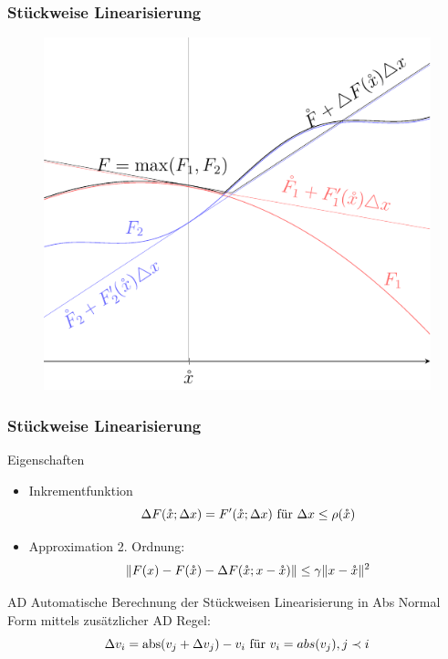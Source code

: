 \begin{frame}[<+->]
\frametitle{Stückweise Linearisierung}
\begin{figure}
\centering
\includegraphics[width=0.65\linewidth]{../dipl_tex/img/tikz/piecewise_linearization.pdf}
\end{figure}
\end{frame}

\begin{frame}[<+->]
\frametitle{Stückweise Linearisierung}
\begin{block}{Eigenschaften}
 \begin{itemize}
  \item Inkrementfunktion 
    \[\Delta F(\mathring{x};\Delta x) = F'(\mathring{x};\Delta x)~ \text{für } \Delta x \leq \rho(\mathring{x})\]
  \item Approximation 2. Ordnung: \[\|F(x) - F(\mathring{x})- \Delta F(\mathring{x};x-\mathring{x})\| \leq \gamma \|x-\mathring{x}\|^2\]
 \end{itemize}
\end{block}
\begin{block}{AD}
 Automatische Berechnung der Stückweisen Linearisierung in Abs Normal Form mittels zusätzlicher AD Regel:
 \[
    \Delta v_i =\operatorname{abs}(v_j + \Delta v_j) - v_i \text{ für } v_i = abs(v_j), j\prec i
 \]
\end{block}

\end{frame}
